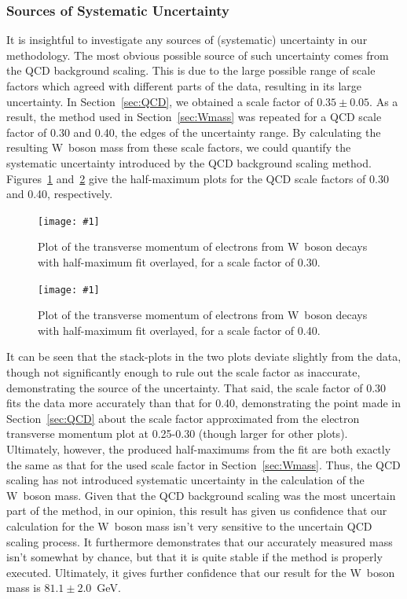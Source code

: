 \documentclass[twocolumn]{article}
\newcommand{\insertFigure}[1]{%
   \texttt{[image: \#1]}%
}
\begin{document}
\subsubsection{Sources of Systematic Uncertainty}
It is insightful to investigate any sources of (systematic) uncertainty in our methodology. The most obvious possible source of such uncertainty comes from the QCD background scaling. This is due to the large possible range of scale factors which agreed with different parts of the data, resulting in its large uncertainty. In Section~\ref{sec:QCD}, we obtained a scale factor of $0.35 \pm 0.05$. As a result, the method used in Section~\ref{sec:Wmass} was repeated for a QCD scale factor of 0.30 and 0.40, the edges of the uncertainty range. By calculating the resulting W~boson mass from these scale factors, we could quantify the systematic uncertainty introduced by the QCD background scaling method. Figures~\ref{fig:W1} and~\ref{fig:W2} give the half-maximum plots for the QCD scale factors of 0.30 and 0.40, respectively. 
\begin{figure}[!h]
	\centering
	\insertFigure{Images/Wmass_30.png}
	\caption{Plot of the transverse momentum of electrons from W~boson decays with half-maximum fit overlayed, for a scale factor of 0.30.}
	\label{fig:W1}
\end{figure}
\begin{figure}[!h]
	\centering
	\insertFigure{Images/Wmass_40.png}
	\caption{Plot of the transverse momentum of electrons from W~boson decays with half-maximum fit overlayed, for a scale factor of 0.40.}
	\label{fig:W2}
\end{figure}
It can be seen that the stack-plots in the two plots deviate slightly from the data, though not significantly enough to rule out the scale factor as inaccurate, demonstrating the source of the uncertainty. That said, the scale factor of 0.30 fits the data more accurately than that for 0.40, demonstrating the point made in Section~\ref{sec:QCD} about the scale factor approximated from the electron transverse momentum plot at 0.25-0.30 (though larger for other plots). Ultimately, however, the produced half-maximums from the fit are both exactly the same as that for the used scale factor in Section~\ref{sec:Wmass}. Thus, the QCD scaling has not introduced systematic uncertainty in the calculation of the W~boson mass. Given that the QCD background scaling was the most uncertain part of the method, in our opinion, this result has given us confidence that our calculation for the W~boson mass isn't very sensitive to the uncertain QCD scaling process. It furthermore demonstrates that our accurately measured mass isn't somewhat by chance, but that it is quite stable if the method is properly executed. Ultimately, it gives further confidence that our result for the W~boson mass is $81.1 \pm 2.0$~GeV.
\end{document}
